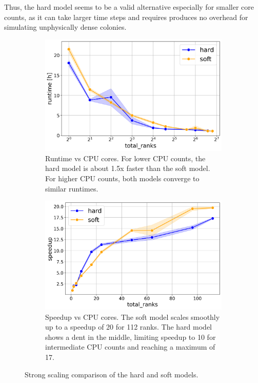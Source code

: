 \documentclass[conference]{IEEEtran}
\begin{document}
Thus, the hard model seems to be a valid alternative especially for smaller core counts, as it can take larger time steps and requires produces no overhead for simulating unphysically dense colonies.


\begin{figure}[H]
    \centering
    \begin{subfigure}[b]{1\linewidth}
        \includegraphics[width=\linewidth]{figures/runtimes/strong_scaling_runtime_hard_soft.png}
        \caption{Runtime vs CPU cores. For lower CPU counts, the hard model is about 1.5x faster than the soft model. For higher CPU counts, both models converge to similar runtimes.}
        \label{fig:runtime_hard_soft}
    \end{subfigure}


    \begin{subfigure}[b]{1\linewidth}
        \includegraphics[width=\linewidth]{figures/runtimes/strong_scaling_speedup_hard_soft.png}
        \caption{Speedup vs CPU cores. The soft model scales smoothly up to a speedup of 20 for 112 ranks. The hard model shows a dent in the middle, limiting speedup to 10 for intermediate CPU counts and reaching a maximum of 17.}
        \label{fig:speedup_hard_soft}
    \end{subfigure}

    \caption{Strong scaling comparison of the hard and soft models.}
\end{figure}
\end{document}
